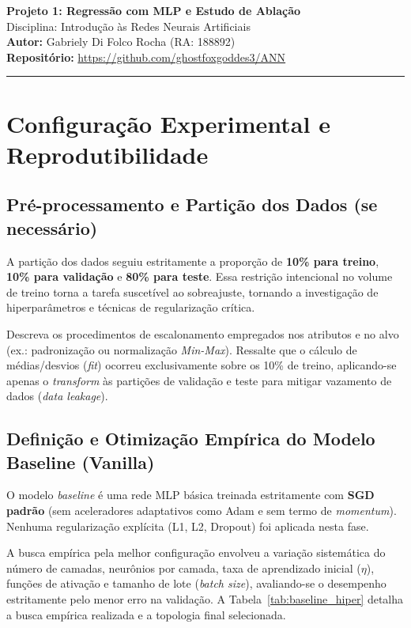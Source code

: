 \documentclass[11pt,a4paper]{article}
\begin{document}
\begin{center}
    {\LARGE \textbf{Projeto 1: Regressão com MLP e Estudo de Ablação}} \\[0.35em]
    {\large Disciplina: Introdução às Redes Neurais Artificiais} \\[0.3em]
    \textbf{Autor:} Gabriely Di Folco Rocha (RA: 188892) \\[0.2em]
    \textbf{Repositório:} \url{https://github.com/ghostfoxgoddes3/ANN}
\end{center}
\vspace{-0.5em}
\hrule
\vspace{0.8em}

\section{Configuração Experimental e Reprodutibilidade}

\subsection{Pré-processamento e Partição dos Dados (se necessário)}
A partição dos dados seguiu estritamente a proporção de \textbf{10\% para treino}, \textbf{10\% para validação} e \textbf{80\% para teste}. Essa restrição intencional no volume de treino torna a tarefa suscetível ao sobreajuste, tornando a investigação de hiperparâmetros e técnicas de regularização crítica.

Descreva os procedimentos de escalonamento empregados nos atributos e no alvo (ex.: padronização ou normalização \textit{Min-Max}). Ressalte que o cálculo de médias/desvios (\textit{fit}) ocorreu exclusivamente sobre os 10\% de treino, aplicando-se apenas o \textit{transform} às partições de validação e teste para mitigar vazamento de dados (\textit{data leakage}).

\subsection{Definição e Otimização Empírica do Modelo Baseline (Vanilla)}
O modelo \textit{baseline} é uma rede MLP básica treinada estritamente com \textbf{SGD padrão} (sem aceleradores adaptativos como Adam e sem termo de \textit{momentum}). Nenhuma regularização explícita (L1, L2, Dropout) foi aplicada nesta fase.

A busca empírica pela melhor configuração envolveu a variação sistemática do número de camadas, neurônios por camada, taxa de aprendizado inicial ($\eta$), funções de ativação e tamanho de lote (\textit{batch size}), avaliando-se o desempenho estritamente pelo menor erro na validação. A Tabela~\ref{tab:baseline_hiper} detalha a busca empírica realizada e a topologia final selecionada.
\end{document}
